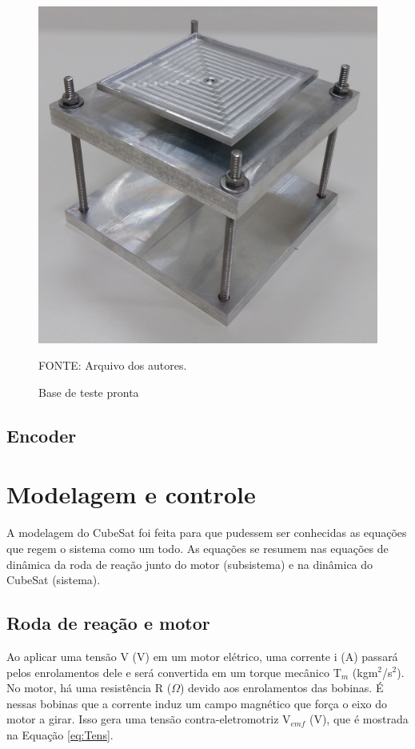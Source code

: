 \documentclass[
	12pt,				%
	openany,			%
	twoside,			%
	a4paper,			%
	english,			%
	french,				%
	spanish,			%
	brazil,				%
	oldfontcommands
	]{abntex2}
\begin{document}
\begin{figure}[th]
	\caption{Base de teste pronta}
	\centering
	\includegraphics[width=0.6\linewidth]{./figs/Test_Base_Proto}
	
	\begin{small}
		FONTE: Arquivo dos autores.
	\end{small}
	\label{fig:ProtoTBOK}
\end{figure}

\newpage

\subsection{Encoder}



\section{Modelagem e controle}

A modelagem do CubeSat foi feita para que pudessem ser conhecidas as equações que regem o sistema como um todo. As equações se resumem nas equações de dinâmica da roda de reação junto do motor (subsistema) e na dinâmica do CubeSat (sistema).

\subsection{Roda de reação e motor}

Ao aplicar uma tensão V (V) em um motor elétrico, uma corrente i (A) passará pelos enrolamentos dele e será convertida em um torque mecânico T$_{m}$ (kgm$^{2}$/s$^{2}$). No motor, há uma resistência R ($\Omega$) devido aos enrolamentos das bobinas. É nessas bobinas que a corrente induz um campo magnético que força o eixo do motor a girar. Isso gera uma tensão contra-eletromotriz V$_{emf}$ (V), que é mostrada na Equação \ref{eq:Tens}.
\end{document}
